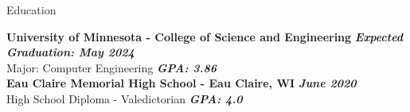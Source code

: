 \documentclass{resume} %
\begin{document}
\vspace*{-\baselineskip}







\begin{rSection}{Education}

	\smallskip
	{\bf University of Minnesota - College of Science and Engineering} \hfill {\bf{\em Expected Graduation: May 2024}} \\ 
	Major: Computer Engineering  \hfill {\bf{\em GPA: 3.86}}\\
	
		\smallskip
	{\bf Eau Claire Memorial High School - Eau Claire, WI} \hfill {\bf{\em June 2020}} \\ 
	High School Diploma - Valedictorian  \hfill {\bf{\em GPA: 4.0}}\\

\end{rSection}
\vspace*{-\baselineskip}
\end{document}
